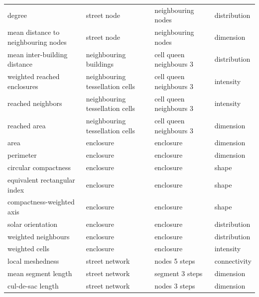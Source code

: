 \begin{longtable}{p{5cm}p{4cm}p{4cm}l}
                                  degree &                     street node &         neighbouring nodes & distribution \\
     mean distance to neighbouring nodes &                     street node &         neighbouring nodes &    dimension \\
            mean inter-building distance &          neighbouring buildings &    cell queen neighbours 3 & distribution \\
             weighted reached enclosures & neighbouring tessellation cells &    cell queen neighbours 3 &    intensity \\
                       reached neighbors & neighbouring tessellation cells &    cell queen neighbours 3 &    intensity \\
                            reached area & neighbouring tessellation cells &    cell queen neighbours 3 &    dimension \\
                                    area &                       enclosure &                  enclosure &    dimension \\
                               perimeter &                       enclosure &                  enclosure &    dimension \\
                    circular compactness &                       enclosure &                  enclosure &        shape \\
            equivalent rectangular index &                       enclosure &                  enclosure &        shape \\
               compactness-weighted axis &                       enclosure &                  enclosure &        shape \\
                       solar orientation &                       enclosure &                  enclosure & distribution \\
                     weighted neighbours &                       enclosure &                  enclosure & distribution \\
                          weighted cells &                       enclosure &                  enclosure &    intensity \\
                        local meshedness &                  street network &              nodes 5 steps & connectivity \\
                     mean segment length &                  street network &            segment 3 steps &    dimension \\
                       cul-de-sac length &                  street network &              nodes 3 steps &    dimension \\

\end{longtable}
